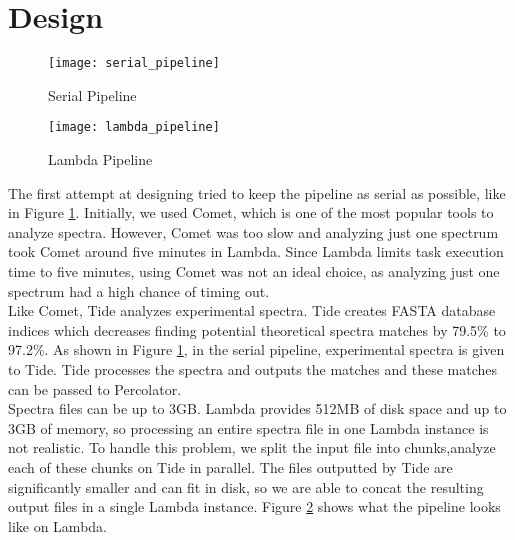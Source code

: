 \section{Design}
\begin{figure}
  \centering
  \texttt{[image: serial\_pipeline]}
  \caption{Serial Pipeline}
  \label{fig:serial_pipeline}
\end{figure}
\begin{figure}
  \centering
  \texttt{[image: lambda\_pipeline]}
  \caption{Lambda Pipeline}
  \label{fig:lambda_pipeline}
\end{figure}

The first attempt at designing \name tried to keep the pipeline as serial as possible, like in Figure \ref{fig:serial_pipeline}.
Initially, we used Comet, which is one of the most popular tools to analyze spectra\cite{comet}.
However, Comet was too slow and analyzing just one spectrum took Comet around five minutes in Lambda.
Since Lambda limits task execution time to five minutes, using Comet was not an ideal choice, as analyzing just one spectrum had a high chance of timing out.\\
\newline
Like Comet, Tide analyzes experimental spectra.
Tide creates FASTA database indices which decreases finding potential theoretical spectra matches by 79.5\% to 97.2\%\cite{crux}.
As shown in Figure \ref{fig:serial_pipeline}, in the serial pipeline, experimental spectra is given to Tide.
Tide processes the spectra and outputs the matches and these matches can be passed to Percolator.\\
\newline
Spectra files can be up to 3GB. Lambda provides 512MB of disk space and up to 3GB of memory, so processing an entire spectra file in one Lambda instance is not realistic.
To handle this problem, we split the input file into chunks,analyze each of these chunks on Tide in parallel.
The files outputted by Tide are significantly smaller and can fit in disk, so we are able to concat the resulting output files in a single Lambda instance.
Figure \ref{fig:lambda_pipeline} shows what the pipeline looks like on Lambda.
\newline


